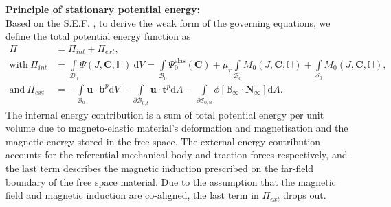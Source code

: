 \documentclass[11pt,a4paper,final]{article}
\begin{document}
\noindent \textbf{Principle of stationary potential energy:} \\
Based on the S.E.F. , to derive the weak form of the governing equations, we define the total potential energy function as
\begin{align}
\Pi &= \Pi_{int} + \Pi_{ext}, \\
\text{with} \ \Pi_{int} &= \int\limits_{\mathcal{D}_0} \Psi (J, \mathbf{C}, \mathbb{H}) \ \mathrm{d}V = \int\limits_{\mathcal{B}_0} \Psi_0^{\text{elas}} (\mathbf{C}) + \mu_r \int\limits_{\mathcal{B}_0} M_0 (J, \mathbf{C}, \mathbb{H}) + \int\limits_{\mathcal{S}_0} M_0 (J, \mathbf{C}, \mathbb{H}), \label{eq:3.24.1}\\
\text{and} \ \Pi_{ext} &= -\int\limits_{\mathcal{B}_0} \mathbf{u} \cdot \mathbf{b}^p \mathrm{d} V - \int\limits_{\partial \mathcal{B}_{0,t}} \mathbf{u} \cdot \mathbf{t}^p \mathrm{d}A -\int\limits_{\partial \mathcal{S}_{0,\mathbb{B}}} \phi \left[ \mathbb{B}_{\infty} \cdot \mathbf{N}_{\infty} \right] \mathrm{d}A.  
\label{eq:3.24.2}
\end{align}
The internal energy contribution  is a sum of total potential energy per unit volume due to magneto-elastic material's deformation and magnetisation and the magnetic energy stored in the free space. The external energy contribution  accounts for the referential mechanical body and traction forces respectively, and the last term describes the magnetic induction prescribed on the far-field boundary of the free space material. Due to the assumption that the magnetic field and magnetic induction are co-aligned, the last term in $\Pi_{ext}$ drops out. \par 
\end{document}
